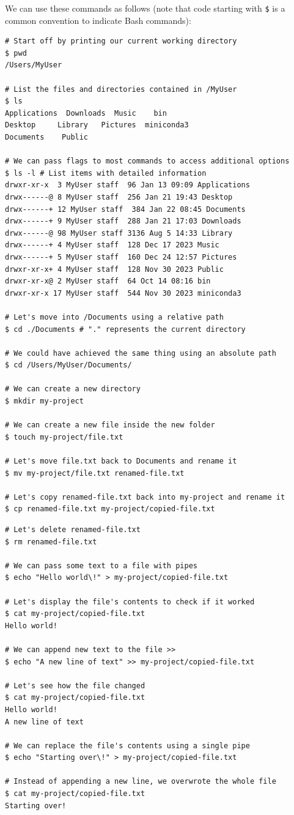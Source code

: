 \documentclass[12pt]{article}
\begin{document}
\pagebreak
We can use these commands as follows (note that code starting with
\texttt{\$} is a common convention to indicate Bash commands):

\begin{verbatim}
# Start off by printing our current working directory
$ pwd
/Users/MyUser

# List the files and directories contained in /MyUser
$ ls
Applications  Downloads  Music    bin
Desktop     Library   Pictures  miniconda3
Documents    Public

# We can pass flags to most commands to access additional options
$ ls -l # List items with detailed information
drwxr-xr-x  3 MyUser staff  96 Jan 13 09:09 Applications
drwx------@ 8 MyUser staff  256 Jan 21 19:43 Desktop
drwx------+ 12 MyUser staff  384 Jan 22 08:45 Documents
drwx------+ 9 MyUser staff  288 Jan 21 17:03 Downloads
drwx------@ 98 MyUser staff 3136 Aug 5 14:33 Library
drwx------+ 4 MyUser staff  128 Dec 17 2023 Music
drwx------+ 5 MyUser staff  160 Dec 24 12:57 Pictures
drwxr-xr-x+ 4 MyUser staff  128 Nov 30 2023 Public
drwxr-xr-x@ 2 MyUser staff  64 Oct 14 08:16 bin
drwxr-xr-x 17 MyUser staff  544 Nov 30 2023 miniconda3

# Let's move into /Documents using a relative path
$ cd ./Documents # "." represents the current directory

# We could have achieved the same thing using an absolute path
$ cd /Users/MyUser/Documents/

# We can create a new directory
$ mkdir my-project

# We can create a new file inside the new folder
$ touch my-project/file.txt

# Let's move file.txt back to Documents and rename it
$ mv my-project/file.txt renamed-file.txt

# Let's copy renamed-file.txt back into my-project and rename it
$ cp renamed-file.txt my-project/copied-file.txt
\end{verbatim}

\pagebreak
\begin{verbatim}
# Let's delete renamed-file.txt
$ rm renamed-file.txt

# We can pass some text to a file with pipes
$ echo "Hello world\!" > my-project/copied-file.txt

# Let's display the file's contents to check if it worked
$ cat my-project/copied-file.txt
Hello world!

# We can append new text to the file >>
$ echo "A new line of text" >> my-project/copied-file.txt

# Let's see how the file changed
$ cat my-project/copied-file.txt
Hello world!
A new line of text

# We can replace the file's contents using a single pipe
$ echo "Starting over\!" > my-project/copied-file.txt

# Instead of appending a new line, we overwrote the whole file
$ cat my-project/copied-file.txt
Starting over!
\end{verbatim}
\end{document}
